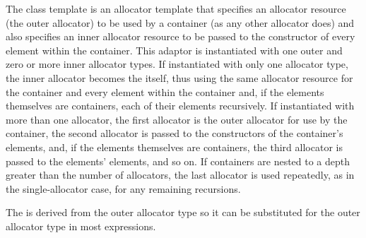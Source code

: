 \pnum
The class template  is an allocator template that
specifies an allocator resource (the outer allocator) to be used by a container (as any
other allocator does) and also specifies an inner allocator resource to be passed to the
constructor of every element within the container. This adaptor is instantiated with one
outer and zero or more inner allocator types. If instantiated with only one allocator
type, the inner allocator becomes the  itself, thus
using the same allocator resource for the container and every element within the
container and, if the elements themselves are containers, each of their elements
recursively. If instantiated with more than one allocator, the first allocator is the
outer allocator for use by the container, the second allocator is passed to the
constructors of the container's elements, and, if the elements themselves are
containers, the third allocator is passed to the elements' elements, and so on. If
containers are nested to a depth greater than the number of allocators, the last
allocator is used repeatedly, as in the single-allocator case, for any remaining
recursions.
\begin{note}
The  is derived from the outer
allocator type so it can be substituted for the outer allocator type in most
expressions.
\end{note}

